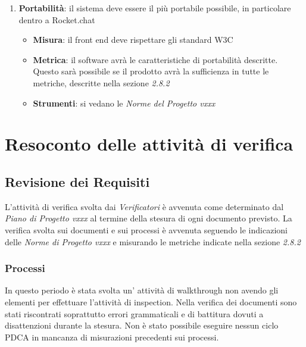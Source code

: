 {\begin{enumerate}
  \item \textbf{Portabilità}: il sistema deve essere il più portabile possibile, in particolare dentro a Rocket.chat
  \begin{itemize}
    \item \textbf{Misura}: il front end deve rispettare gli standard W3C
    \item \textbf{Metrica}: il software avrà le caratteristiche di
    portabilità descritte. Questo sarà possibile se il prodotto
    avrà la sufficienza in tutte le metriche, descritte nella sezione \emph{2.8.2}
    \item \textbf{Strumenti}: si vedano le \emph{Norme del Progetto vxxx}
  \end{itemize}
\end{enumerate}




\section{Resoconto delle attività di verifica}

\subsection{Revisione dei Requisiti}

L’attività di verifica svolta dai  \emph{Verificatori}  è avvenuta come determinato dal \emph{Piano di Progetto
vxxx} al termine della stesura di ogni documento previsto. La verifica svolta sui documenti e
sui processi è avvenuta seguendo le indicazioni delle  \emph{Norme di Progetto vxxx}  e misurando le
metriche indicate nella sezione \emph{2.8.2}

\subsubsection{Processi}

In questo periodo è stata svolta un' attività di walkthrough non avendo gli elementi
per effettuare l'attività di inspection. Nella verifica dei documenti sono stati riscontrati soprattutto errori grammaticali e di battitura dovuti a disattenzioni durante la stesura.
Non è stato possibile eseguire nessun ciclo PDCA in mancanza di misurazioni precedenti sui processi.

}
